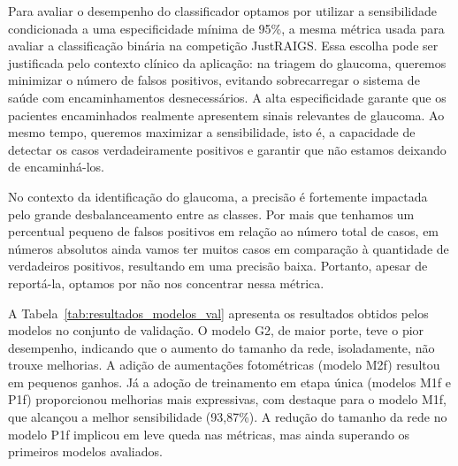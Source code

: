 \documentclass[12pt]{article}
\begin{document}
Para avaliar o desempenho do classificador optamos por utilizar a sensibilidade condicionada a uma especificidade mínima de 95\%, a mesma métrica usada para avaliar a classificação binária na competição JustRAIGS. Essa escolha pode ser justificada pelo  contexto clínico da aplicação: na triagem do glaucoma, queremos minimizar o número de falsos positivos, evitando sobrecarregar o sistema de saúde com encaminhamentos desnecessários. A alta especificidade garante que os pacientes encaminhados realmente apresentem sinais relevantes de glaucoma. Ao mesmo tempo, queremos maximizar a sensibilidade, isto é, a capacidade de detectar os casos verdadeiramente positivos e garantir que não estamos deixando de encaminhá-los.

No contexto da identificação do glaucoma, a precisão é fortemente impactada pelo grande desbalanceamento entre as classes. Por mais que tenhamos um percentual pequeno de falsos positivos em relação ao número total de casos, em números absolutos ainda vamos ter muitos casos em comparação à quantidade de verdadeiros positivos, resultando em uma precisão baixa. Portanto, apesar de reportá-la, optamos por não nos concentrar nessa métrica.

A Tabela~\ref{tab:resultados_modelos_val} apresenta os resultados obtidos pelos modelos no conjunto de validação. O modelo G2, de maior porte, teve o pior desempenho, indicando que o aumento do tamanho da rede, isoladamente, não trouxe melhorias. A adição de aumentações fotométricas (modelo M2f) resultou em pequenos ganhos. Já a adoção de treinamento em etapa única (modelos M1f e P1f) proporcionou melhorias mais expressivas, com destaque para o modelo M1f, que alcançou a melhor sensibilidade (93,87\%). A redução do tamanho da rede no modelo P1f implicou em leve queda nas métricas, mas ainda superando os primeiros modelos avaliados.
\end{document}
